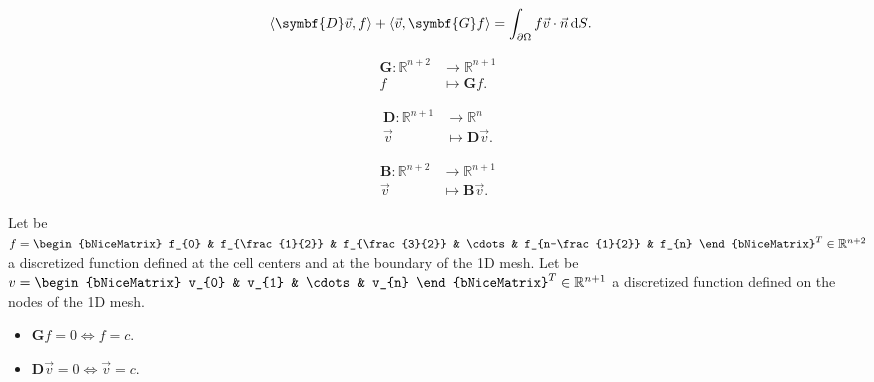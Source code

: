\begin{align*}
	\left\langle
	\symbf{D}\vec{v},
	f
	\right\rangle+
	\left\langle
	\vec{v},
	\symbf{G}f
	\right\rangle & =
	\int_{\partial\Omega}
	f\vec{v}\cdot\vec{n}\dl S.
\end{align*}

\begin{align*}
	\symbf{G}\colon\mathbb{R}^{n+2} & \longrightarrow
	\mathbb{R}^{n+1}                                  \\
	f                               & \longmapsto
	\symbf{G}f.
\end{align*}

\begin{align*}
	\symbf{D}\colon\mathbb{R}^{n+1} & \longrightarrow
	\mathbb{R}^{n}                                    \\
	\vec{v}                         & \longmapsto
	\symbf{D}\vec{v}.
\end{align*}

\begin{align*}
	\symbf{B}\colon\mathbb{R}^{n+2} & \longrightarrow
	\mathbb{R}^{n+1}                                  \\
	\vec{v}                         & \longmapsto
	\symbf{B}\vec{v}.
\end{align*}

\begin{theorem}{}{}
	Let be
	\begin{math}
		f=
		\begin{bNiceMatrix}
			f_{0}             &
			f_{\frac{1}{2}}   &
			f_{\frac{3}{2}}   &
			\cdots            &
			f_{n-\frac{1}{2}} &
			f_{n}
		\end{bNiceMatrix}^{T}\in\mathbb{R}^{n+2}
	\end{math}
	a discretized function defined at the cell centers and
	at the boundary of the 1D mesh.
	Let be
	\begin{math}
		v=
		\begin{bNiceMatrix}
			v_{0}  &
			v_{1}  &
			\cdots &
			v_{n}
		\end{bNiceMatrix}^{T}\in\mathbb{R}^{n+1}
	\end{math}
	a discretized function defined on the nodes of the 1D mesh.

	\begin{itemize}
		\item

		      \begin{math}
			      \symbf{G}f=
			      0\iff f=
			      c
		      \end{math}.

		\item

		      \begin{math}
			      \symbf{D}\vec{v}=
			      0\iff\vec{v}=
			      c
		      \end{math}.
	\end{itemize}
\end{theorem}

